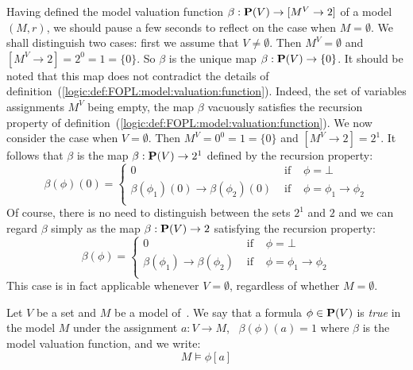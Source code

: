 Having defined the model valuation function $\beta:\mbox{${\bf P}(V)$}\to[M^{V}\to
2]$ of a model $(M,r)$, we should pause a few seconds to reflect on
the case when $M=\emptyset$. We shall distinguish two cases: first
we assume that $V\neq\emptyset$. Then $M^{V}=\emptyset$ and
$[M^{V}\to 2] =2^{0}=1=\{0\}$. So $\beta$ is the unique map
$\beta:\mbox{${\bf P}(V)$}\to\{0\}$. It should be noted that this map does not
contradict the details of
definition~(\ref{logic:def:FOPL:model:valuation:function}). Indeed,
the set of variables assignments $M^{V}$ being empty, the map
$\beta$ vacuously satisfies the recursion property of
definition~(\ref{logic:def:FOPL:model:valuation:function}). We now
consider the case when $V=\emptyset$. Then $M^{V}=0^0=1=\{0\}$ and
$[M^{V}\to 2]=2^{1}$. It follows that $\beta$ is the map
$\beta:\mbox{${\bf P}(V)$}\to 2^{1}$ defined by the recursion property:
    \[
                    \beta(\phi)(0)=\left\{
                    \begin{array}{lcl}
                    0&\mbox{\ if\ }&\phi=\bot\\
                    \beta(\phi_{1})(0)\to\beta(\phi_{2})(0)&\mbox{\ if\ }&
                    \phi=\phi_{1}\to\phi_{2}\\
                    \end{array}\right.
    \]
Of course, there is no need to distinguish between the sets $2^{1}$
and $2$ and we can regard $\beta$ simply as the map $\beta:\mbox{${\bf P}(V)$}\to 2$
satisfying the recursion property:
    \[
                    \beta(\phi)=\left\{
                    \begin{array}{lcl}
                    0&\mbox{\ if\ }&\phi=\bot\\
                    \beta(\phi_{1})\to\beta(\phi_{2})&\mbox{\ if\ }&
                    \phi=\phi_{1}\to\phi_{2}\\
                    \end{array}\right.
    \]
This case is in fact applicable whenever $V=\emptyset$, regardless
of whether $M=\emptyset$.

\begin{defin}\label{logic:def:FOPL:model:truth}
Let $V$ be a set and $M$ be a model of\, \pv. We say that a formula
$\phi\in\mbox{${\bf P}(V)$}$ is {\em true} in the model $M$ under the assignment
$a:V\to M$, \ifand\ $\beta(\phi)(a)=1$ where $\beta$ is the model
valuation function, and we write:
    \[
        M\vDash\phi[a]
    \]
\end{defin}

